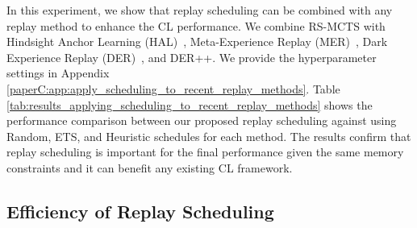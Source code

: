 In this experiment, we show that replay scheduling can be combined with any replay method to enhance the CL performance. We combine RS-MCTS with Hindsight Anchor Learning (HAL)~, Meta-Experience Replay (MER)~, Dark Experience Replay (DER)~, and DER++. We provide the hyperparameter settings in Appendix \ref{paperC:app:apply_scheduling_to_recent_replay_methods}. Table \ref{tab:results_applying_scheduling_to_recent_replay_methods} shows the performance comparison between our proposed replay scheduling against using Random, ETS, and Heuristic schedules for each method. The results confirm that replay scheduling %
is important for the final performance given the same memory constraints and it can benefit any existing CL framework. 


%
\subsection{Efficiency of Replay Scheduling}
\label{paperC:sec:efficiency_of_replay_scheduling}

